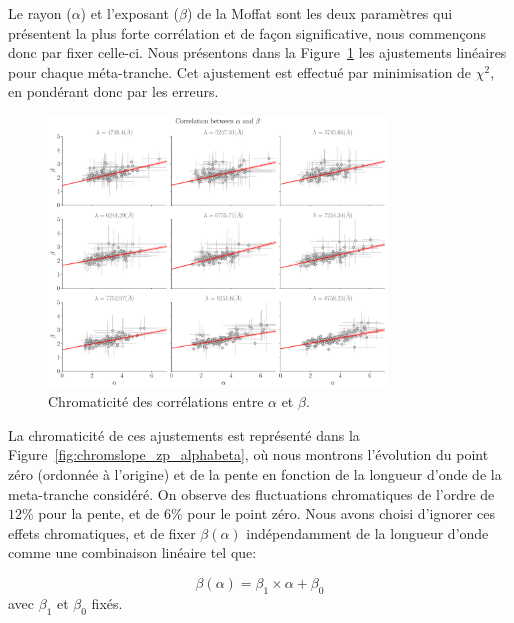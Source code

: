 \documentclass[../main/main.tex]{subfiles}
\begin{document}
Le rayon ($\alpha$) et l'exposant ($\beta$) de la Moffat sont les deux
paramètres qui présentent la plus forte corrélation et de façon significative, nous commençons
donc par fixer celle-ci. Nous présentons dans la
Figure~\ref{fig:alphabetachromcorr} les ajustements linéaires pour
chaque méta-tranche. Cet ajustement est effectué par minimisation de
$\chi^{2}$, en pondérant donc par les erreurs.


\begin{figure}[ht]
  \centering
  \includegraphics[width=0.8\textwidth]{../figures/06_irf/STD_alpha_beta_chromatic_corr.pdf}
  \caption[Chromaticité des corrélations entre $\alpha$ et $\beta$]{Chromaticité des corrélations entre $\alpha$ et $\beta$.}
  \label{fig:alphabetachromcorr}
\end{figure}

La chromaticité de ces ajustements est représenté dans la
Figure~\ref{fig:chromslope_zp_alphabeta}, où nous montrons l'évolution
du point zéro (ordonnée à l'origine) et de la pente en fonction de la
longueur d'onde de la meta-tranche considéré. On observe des fluctuations
chromatiques de l'ordre de $12\%$ pour la pente, et de $6\%$ pour le
point zéro.
Nous avons choisi d'ignorer ces effets chromatiques, et de fixer
$\beta(\alpha)$ indépendamment de la longueur d'onde comme une
combinaison linéaire tel que:

\begin{equation}
  \label{eq:betaalpha}
  \beta(\alpha) = \beta_{1}\times \alpha + \beta_{0}
\end{equation}
avec $\beta_{1}$ et $\beta_{0}$ fixés.
\end{document}
